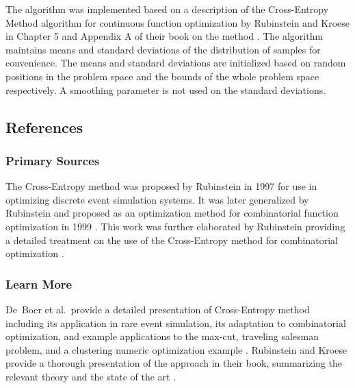 The algorithm was implemented based on a description of the Cross-Entropy Method algorithm for continuous function optimization by Rubinstein and Kroese in Chapter 5 and Appendix A of their book on the method \cite{Rubinstein2004}. The algorithm maintains means and standard deviations of the distribution of samples for convenience. The means and standard deviations are initialized based on random positions in the problem space and the bounds of the whole problem space respectively. A smoothing parameter is not used on the standard deviations.



\subsection{References}

% 
% 
\subsubsection{Primary Sources}
The Cross-Entropy method was proposed by Rubinstein in 1997 \cite{Rubinstein1997} for use in optimizing discrete event simulation systems. It was later generalized by Rubinstein and proposed as an optimization method for combinatorial function optimization in 1999 \cite{Rubinstein1999}.
This work was further elaborated by Rubinstein providing a detailed treatment on the use of the Cross-Entropy method for combinatorial optimization \cite{Rubinstein2001}.



% 
% 
\subsubsection{Learn More}
De~Boer et al.\ provide a detailed presentation of Cross-Entropy method including its application in rare event simulation, its adaptation to combinatorial optimization, and example applications to the max-cut, traveling salesman problem, and a clustering numeric optimization example \cite{DeBoer2005}.
Rubinstein and Kroese provide a thorough presentation of the approach in their book, summarizing the relevant theory and the state of the art \cite{Rubinstein2004}.


